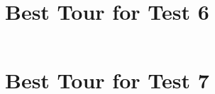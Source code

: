 \documentclass[11pt]{scrreprt}
\begin{document}
\begin{lstlisting}[basicstyle=\small,language=c]

\end{lstlisting}


\section{Best Tour for Test 6}

\begin{lstlisting}[basicstyle=\small,language=c]

\end{lstlisting}


\section{Best Tour for Test 7}

\begin{lstlisting}[basicstyle=\small,language=c]

\end{lstlisting}
\end{document}

